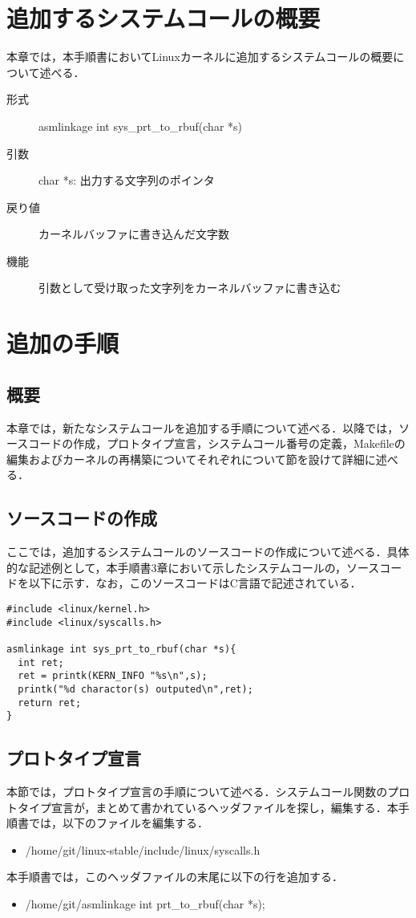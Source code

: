 \documentclass[12pt]{jsarticle}
\begin{document}
\section{追加するシステムコールの概要}
本章では，本手順書においてLinuxカーネルに追加するシステムコールの概要について述べる．
\begin{description}
\item[形式] asmlinkage int sys\_prt\_to\_rbuf(char *s)
\item[引数] char *s: 出力する文字列のポインタ
\item[戻り値] カーネルバッファに書き込んだ文字数
\item[機能] 引数として受け取った文字列をカーネルバッファに書き込む
  
\end{description}
\section{追加の手順}
\subsection{概要}
本章では，新たなシステムコールを追加する手順について述べる．以降では，ソースコードの作成，プロトタイプ宣言，システムコール番号の定義，Makefileの編集およびカーネルの再構築についてそれぞれについて節を設けて詳細に述べる．
\subsection{ソースコードの作成}
ここでは，追加するシステムコールのソースコードの作成について述べる．具体的な記述例として，本手順書3章において示したシステムコールの，ソースコードを以下に示す．なお，このソースコードはC言語で記述されている．
\begin{verbatim}
#include <linux/kernel.h>
#include <linux/syscalls.h>

asmlinkage int sys_prt_to_rbuf(char *s){
  int ret;
  ret = printk(KERN_INFO "%s\n",s);
  printk("%d charactor(s) outputed\n",ret);
  return ret;
}
\end{verbatim}
\subsection{プロトタイプ宣言}
本節では，プロトタイプ宣言の手順について述べる．システムコール関数のプロトタイプ宣言が，まとめて書かれているヘッダファイルを探し，編集する．本手順書では，以下のファイルを編集する．
\begin{itemize}
\item \slash{}home\slash{}git\slash{}linux-stable\slash{}include\slash{}linux\slash{}syscalls.h
\end{itemize}
本手順書では，このヘッダファイルの末尾に以下の行を追加する．
\begin{itemize}
\item \slash{}home\slash{}git\slash{}asmlinkage int prt\_to\_rbuf(char *s);
\end{itemize}
\end{document}
